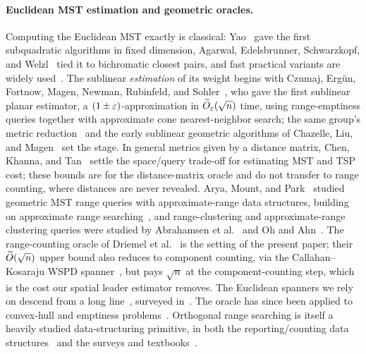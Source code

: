 \paragraph{Euclidean MST estimation and geometric oracles.}
Computing the Euclidean MST exactly is classical: Yao~\cite{Yao82} gave the first subquadratic algorithms
in fixed dimension, Agarwal, Edelsbrunner, Schwarzkopf, and Welzl~\cite{AESW91} tied it to bichromatic
closest pairs, and fast practical variants are widely used~\cite{MarchRamGray10}. The sublinear
\emph{estimation} of its weight begins with Czumaj, Erg\"un, Fortnow, Magen, Newman, Rubinfeld, and
Sohler~\cite{Czumaj05}, who gave the first sublinear planar estimator, a $(1\pm\varepsilon)$-approximation in
$\widetilde{O}_\varepsilon(\sqrt n)$ time, using range-emptiness queries together with approximate cone nearest-neighbor
search; the same group's metric reduction~\cite{CzumajSohler04,CzumajSohler09} and the early sublinear
geometric algorithms of Chazelle, Liu, and Magen~\cite{ChazelleLiuMagen03} set the stage. In general metrics given by a distance
matrix, Chen, Khanna, and Tan~\cite{ChenKhannaTan23} settle the space/query trade-off for estimating MST
and TSP cost; these bounds are for the distance-matrix oracle and do not transfer to range counting,
where distances are never revealed. Arya, Mount, and
Park~\cite{AryaMountPark15} studied geometric MST range queries with approximate-range data structures,
building on approximate range searching~\cite{AryaMount00}, and range-clustering and approximate-range
clustering queries were studied by Abrahamsen et al.~\cite{AbrahamsenEtal17} and Oh and
Ahn~\cite{OhAhn18}. The range-counting oracle of Driemel et al.~\cite{DMOSW25} is the setting of the
present paper; their $\widetilde{O}(\sqrt n)$ upper bound also reduces to component counting, via the
Callahan--Kosaraju WSPD spanner~\cite{CK95,HarPeled11,NarasimhanSmid07}, but pays $\sqrt n$ at the
component-counting step, which is the cost our spatial leader estimator removes. The Euclidean spanners we
rely on descend from a long line~\cite{Vaidya91,ADMSS95}, surveyed in~\cite{BoseSmid13,NarasimhanSmid07}.
The oracle has since been applied to convex-hull and emptiness problems~\cite{SchiblerXueZhu26}. Orthogonal
range searching is itself a heavily studied data-structuring primitive, in both the reporting/counting
data structures~\cite{Bentley75,Willard85,Chazelle90,ChanPatrascu10,JaJaMortensenShi04,
AfshaniArgeLarsen09,ChanLarsenPatrascu11,ChanTsakalidis18,Chan19,ShengTao11} and the surveys and
textbooks~\cite{Matousek94,AgarwalErickson99,deBergEtal08}.

